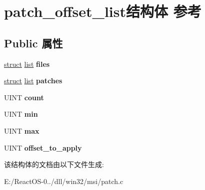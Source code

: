 \hypertarget{structpatch__offset__list}{}\section{patch\+\_\+offset\+\_\+list结构体 参考}
\label{structpatch__offset__list}
\subsection*{Public 属性}
\begin{DoxyCompactItemize}
\item 
\mbox{\label{structpatch__offset__list_a14ee78f523a4a211394b903c6ebb150b}} 
\hyperlink{interfacestruct}{struct} \hyperlink{classlist}{list} {\bfseries files}
\item 
\mbox{\label{structpatch__offset__list_a5f19f5acd9338c6badb4f1b68e1c6891}} 
\hyperlink{interfacestruct}{struct} \hyperlink{classlist}{list} {\bfseries patches}
\item 
\mbox{\label{structpatch__offset__list_a849a2721fa88626377b39359bfc19c74}} 
U\+I\+NT {\bfseries count}
\item 
\mbox{\label{structpatch__offset__list_af625439a11e5831ebc910a644d57ff0c}} 
U\+I\+NT {\bfseries min}
\item 
\mbox{\label{structpatch__offset__list_a17253cb15c130ab90f9dc2602c6baa76}} 
U\+I\+NT {\bfseries max}
\item 
\mbox{\label{structpatch__offset__list_a855a74f0d323971d56d40c9716d7a84a}} 
U\+I\+NT {\bfseries offset\+\_\+to\+\_\+apply}
\end{DoxyCompactItemize}


该结构体的文档由以下文件生成\+:\begin{DoxyCompactItemize}
\item 
E\+:/\+React\+O\+S-\/0../dll/win32/msi/patch.\+c\end{DoxyCompactItemize}
